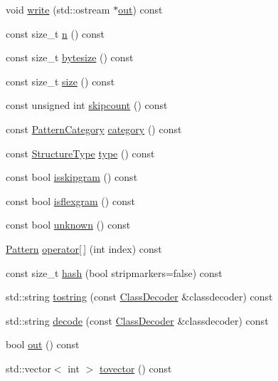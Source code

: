 \begin{DoxyCompactItemize}
\item 
void \hyperlink{classPattern_a17d74bdb4862199e302eae994f4c376f}{write} (std\+::ostream $\ast$\hyperlink{classPattern_ac608089f2fee04e0e8ff6249f14517e4}{out}) const 
\item 
const size\+\_\+t \hyperlink{classPattern_a13e66bbb8dd77219255ade5aa5f72c7c}{n} () const 
\item 
const size\+\_\+t \hyperlink{classPattern_a57440647189b9e07bdf6ddbcfb0b3f7f}{bytesize} () const 
\item 
const size\+\_\+t \hyperlink{classPattern_a400a18c6a1b6de3eb574b6a0f12c9ca2}{size} () const 
\item 
const unsigned int \hyperlink{classPattern_a0ed5bb99641eb8fd96be7890f2ea5c89}{skipcount} () const 
\item 
const \hyperlink{pattern_8h_a17879f85ec892834fb691c61e71dfe54}{Pattern\+Category} \hyperlink{classPattern_af01c6684c8cec38d3ad57d4303dac5fb}{category} () const 
\item 
const \hyperlink{pattern_8h_aff0cb3a143c587463f28ef629d0cd35e}{Structure\+Type} \hyperlink{classPattern_ab5cf03f0619bd68238df9655501eb31e}{type} () const 
\item 
const bool \hyperlink{classPattern_a609a2ba1f832678fb69baa201f50b163}{isskipgram} () const 
\item 
const bool \hyperlink{classPattern_a8bef14a88603946827aa1342b47ec001}{isflexgram} () const 
\item 
const bool \hyperlink{classPattern_ad2325ce11035ced772f72dbfd4b57c01}{unknown} () const 
\item 
\hyperlink{classPattern}{Pattern} \hyperlink{classPattern_a96b22b7fdcfde6313ee6c6452c70edbe}{operator\mbox{[}$\,$\mbox{]}} (int index) const 
\item 
const size\+\_\+t \hyperlink{classPattern_a8b0f2c0b2e993631a44b3e7ba0acc380}{hash} (bool stripmarkers=false) const 
\item 
std\+::string \hyperlink{classPattern_a810d538d873a823d0b6dbe04d2faf334}{tostring} (const \hyperlink{classClassDecoder}{Class\+Decoder} \&classdecoder) const 
\item 
std\+::string \hyperlink{classPattern_abb031f769621b5a2d5652a29a85b86a2}{decode} (const \hyperlink{classClassDecoder}{Class\+Decoder} \&classdecoder) const 
\item 
bool \hyperlink{classPattern_ac608089f2fee04e0e8ff6249f14517e4}{out} () const 
\item 
std\+::vector$<$ int $>$ \hyperlink{classPattern_aea8bcb92b5b11ae358d7645de11a35fd}{tovector} () const 

\end{DoxyCompactItemize}
